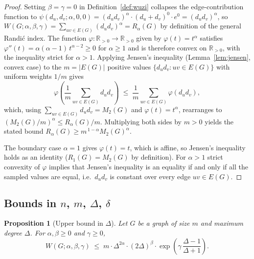 \documentclass[11pt,a4paper]{article}
\newtheorem{proposition}[theorem]{Proposition}
\theoremstyle{definition}
\newcommand{\Wuzi}{W(G;\alpha,\beta,\gamma)}
\begin{document}
\begin{proof}
Setting $\beta=\gamma=0$ in Definition~\ref{def:wuzi} collapses the
edge-contribution function to
$\psi(d_u,d_v;\alpha,0,0)=(d_u d_v)^{\alpha}\cdot(d_u+d_v)^{0}\cdot
e^{0}=(d_u d_v)^{\alpha}$, so
$\Wuzi=\sum_{uv\in E(G)}(d_u d_v)^{\alpha}=R_{\alpha}(G)$ by
definition of the general Randi\'c index. The function
$\varphi:\mathbb{R}_{>0}\to\mathbb{R}_{>0}$ given by $\varphi(t)=t^{\alpha}$
satisfies $\varphi''(t)=\alpha(\alpha-1)\,t^{\alpha-2}\ge 0$ for
$\alpha\ge 1$ and is therefore convex on $\mathbb{R}_{>0}$, with the
inequality strict for $\alpha>1$. Applying Jensen's inequality
(Lemma~\ref{lem:jensen}, convex case) to the $m=|E(G)|$ positive
values $\{d_u d_v : uv\in E(G)\}$ with uniform weights $1/m$ gives
\[
\varphi\!\left(\frac{1}{m}\sum_{uv\in E(G)} d_u d_v\right)
\;\le\;
\frac{1}{m}\sum_{uv\in E(G)} \varphi(d_u d_v),
\]
which, using $\sum_{uv\in E(G)} d_u d_v = M_{2}(G)$ and
$\varphi(t)=t^{\alpha}$, rearranges to
$(M_{2}(G)/m)^{\alpha} \le R_{\alpha}(G)/m$. Multiplying both sides by
$m>0$ yields the stated bound $R_{\alpha}(G)\ge m^{\,1-\alpha}M_{2}(G)^{\alpha}$.

The boundary case $\alpha=1$ gives $\varphi(t)=t$, which is affine,
so Jensen's inequality holds as an identity ($R_{1}(G)=M_{2}(G)$ by
definition). For $\alpha>1$ strict convexity of $\varphi$ implies that
Jensen's inequality is an equality if and only if all the sampled values
are equal, i.e.\ $d_u d_v$ is constant over every edge $uv\in E(G)$.
\end{proof}

\subsection{Bounds in $n$, $m$, $\Delta$, $\delta$}\label{sub:nmDelta}

\begin{proposition}[Upper bound in $\Delta$]\label{thm:upper_Delta}
Let $G$ be a graph of size $m$ and maximum degree $\Delta$. For
$\alpha, \beta \ge 0$ and $\gamma \ge 0$,
\begin{equation}\label{eq:upper_Delta}
\Wuzi \;\le\; m \cdot \Delta^{2\alpha} \cdot (2\Delta)^{\beta}
\cdot \exp\!\left(\gamma\,\frac{\Delta - 1}{\Delta + 1}\right).
\end{equation}
\end{proposition}
\end{document}
